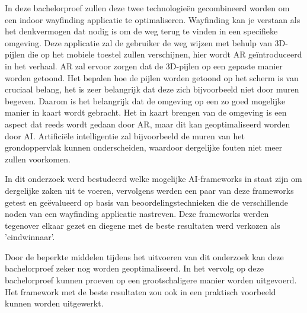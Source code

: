 In deze bachelorproef zullen deze twee technologieën gecombineerd worden om een indoor wayfinding applicatie te optimaliseren. Wayfinding kan je verstaan als het denkvermogen dat nodig is om de weg terug te vinden in een specifieke omgeving. Deze applicatie zal de gebruiker de weg wijzen met behulp van 3D-pijlen die op het mobiele toestel zullen verschijnen, hier wordt AR geïntroduceerd in het verhaal. AR zal ervoor zorgen dat de 3D-pijlen op een gepaste manier worden getoond. Het bepalen hoe de pijlen worden getoond op het scherm is van cruciaal belang, het is zeer belangrijk dat deze zich bijvoorbeeld niet door muren begeven. Daarom is het belangrijk dat de omgeving op een zo goed mogelijke manier in kaart wordt gebracht. Het in kaart brengen van de omgeving is een aspect dat reeds wordt gedaan door AR, maar dit kan geoptimaliseerd worden door AI. Artificiële intelligentie zal bijvoorbeeld de muren van het grondoppervlak kunnen onderscheiden, waardoor dergelijke fouten niet meer zullen voorkomen.

In dit onderzoek werd bestudeerd welke mogelijke AI-frameworks in staat zijn om dergelijke zaken uit te voeren, vervolgens werden een paar van deze frameworks getest en geëvalueerd op basis van beoordelingstechnieken die de verschillende noden van een wayfinding applicatie nastreven. Deze frameworks werden tegenover elkaar gezet en diegene met de beste resultaten werd verkozen als 'eindwinnaar'.

Door de beperkte middelen tijdens het uitvoeren van dit onderzoek kan deze bachelorproef zeker nog worden geoptimaliseerd. In het vervolg op deze bachelorproef kunnen proeven op een grootschaligere manier worden uitgevoerd. Het framework met de beste resultaten zou ook in een praktisch voorbeeld kunnen worden uitgewerkt.

